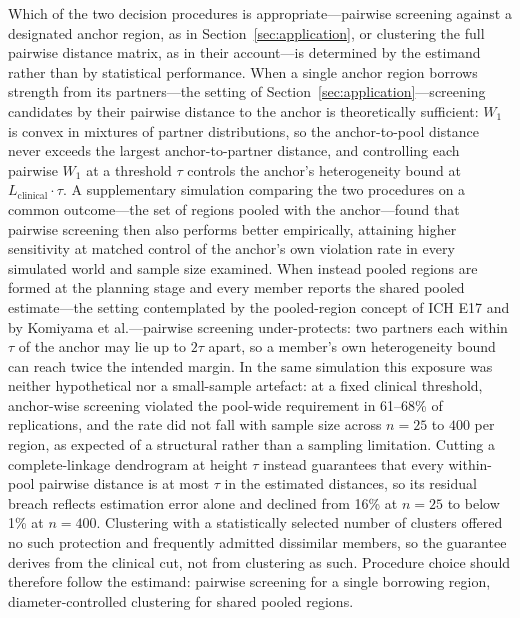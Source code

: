 \documentclass[AMA,Times1COL]{WileyNJDv5}
\begin{document}
Which of the two decision procedures is appropriate---pairwise screening against a designated anchor region, as in Section~\ref{sec:application}, or clustering the full pairwise distance matrix, as in their account---is determined by the estimand rather than by statistical performance. When a single anchor region borrows strength from its partners---the setting of Section~\ref{sec:application}---screening candidates by their pairwise distance to the anchor is theoretically sufficient: $W_1$ is convex in mixtures of partner distributions, so the anchor-to-pool distance never exceeds the largest anchor-to-partner distance, and controlling each pairwise $W_1$ at a threshold $\tau$ controls the anchor's heterogeneity bound at $L_{\text{clinical}} \cdot \tau$. A supplementary simulation comparing the two procedures on a common outcome---the set of regions pooled with the anchor---found that pairwise screening then also performs better empirically, attaining higher sensitivity at matched control of the anchor's own violation rate in every simulated world and sample size examined. When instead pooled regions are formed at the planning stage and every member reports the shared pooled estimate---the setting contemplated by the pooled-region concept of ICH E17\cite{iche17} and by Komiyama et al.\cite{komiyama2024}---pairwise screening under-protects: two partners each within $\tau$ of the anchor may lie up to $2\tau$ apart, so a member's own heterogeneity bound can reach twice the intended margin. In the same simulation this exposure was neither hypothetical nor a small-sample artefact: at a fixed clinical threshold, anchor-wise screening violated the pool-wide requirement in 61--68\% of replications, and the rate did not fall with sample size across $n = 25$ to $400$ per region, as expected of a structural rather than a sampling limitation. Cutting a complete-linkage dendrogram at height $\tau$ instead guarantees that every within-pool pairwise distance is at most $\tau$ in the estimated distances, so its residual breach reflects estimation error alone and declined from 16\% at $n = 25$ to below 1\% at $n = 400$. Clustering with a statistically selected number of clusters offered no such protection and frequently admitted dissimilar members, so the guarantee derives from the clinical cut, not from clustering as such. Procedure choice should therefore follow the estimand: pairwise screening for a single borrowing region, diameter-controlled clustering for shared pooled regions.
\end{document}
